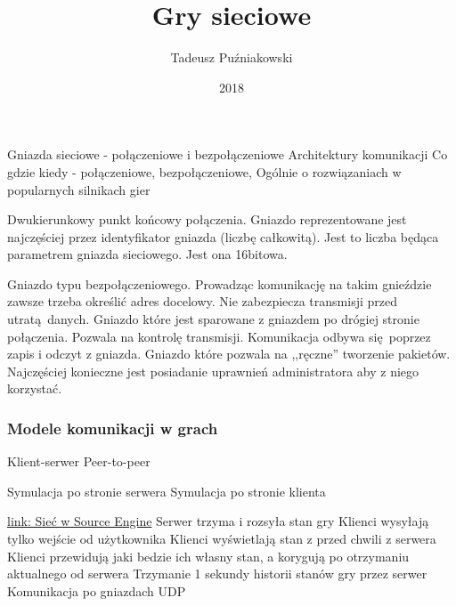 \documentclass{beamer}
\title[Networking]{Gry sieciowe}
\author{Tadeusz Puźniakowski}
\institute{PJATK}
\date{2018}
\begin{document}
\frame{\titlepage}


\begin{frame}[fragile]
		\BI
		\I Gniazda sieciowe - połączeniowe i bezpołączeniowe
		\I Architektury komunikacji
		\I Co gdzie kiedy - połączeniowe, bezpołączeniowe, 
		\I Ogólnie o rozwiązaniach w popularnych silnikach gier
		\EI
	\EB
\end{frame}


\begin{frame}[fragile]
	Dwukierunkowy punkt końcowy połączenia. Gniazdo reprezentowane jest najczęściej przez identyfikator gniazda (liczbę całkowitą).
	\EB
	Jest to liczba będąca parametrem gniazda sieciowego. Jest ona 16bitowa.
	\EB
\end{frame}

\begin{frame}[fragile]
	Gniazdo typu bezpołączeniowego. Prowadząc komunikację na takim gnieździe zawsze trzeba określić adres docelowy. Nie zabezpiecza transmisji przed utratą danych.
	\EB
	Gniazdo które jest sparowane z gniazdem po drógiej stronie połączenia. Pozwala na kontrolę transmisji. Komunikacja odbywa się poprzez zapis i odczyt z gniazda.
	\EB
	Gniazdo które pozwala na ,,ręczne'' tworzenie pakietów. Najczęściej konieczne jest posiadanie uprawnień administratora aby z niego korzystać.
	\EB
\end{frame}

\begin{frame}[fragile]
	\frametitle{Modele komunikacji w grach}
	\BI
	\I Klient-serwer
	\I Peer-to-peer
	\EI
	
	\BI
	\I Symulacja po stronie serwera
	\I Symulacja po stronie klienta
	\EI
\end{frame}

\begin{frame}[fragile]
		\href{https://developer.valvesoftware.com/wiki/Source\_Multiplayer\_Networking}{link: Sieć w Source Engine}
		\BI
		\I Serwer trzyma i rozsyła stan gry
		\I Klienci wysyłają tylko wejście od użytkownika
		\I Klienci wyświetlają stan z przed chwili z serwera
		\I Klienci przewidują jaki bedzie ich własny stan, a korygują po otrzymaniu aktualnego od serwera
		\I Trzymanie 1 sekundy historii stanów gry przez serwer
		\EI
		Komunikacja po gniazdach UDP
	\EB
\end{frame}
\end{document}
